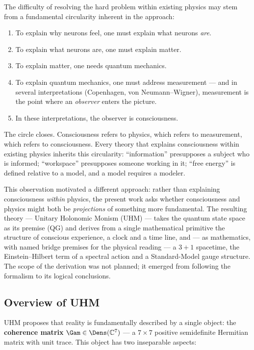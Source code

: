 The difficulty of resolving the hard problem within existing physics may
stem from a fundamental circularity inherent in the approach:

\begin{enumerate}[leftmargin=2em]
  \item To explain why neurons feel, one must explain what neurons \emph{are}.
  \item To explain what neurons are, one must explain matter.
  \item To explain matter, one needs quantum mechanics.
  \item To explain quantum mechanics, one must address measurement --- and in several
        interpretations (Copenhagen, von Neumann--Wigner), measurement is the point where
        an \emph{observer} enters the picture.
  \item In these interpretations, the observer is consciousness.
\end{enumerate}

The circle closes. Consciousness refers to physics, which refers to measurement, which
refers to consciousness. Every theory that explains consciousness within existing physics
inherits this circularity: ``information'' presupposes a subject who is informed;
``workspace'' presupposes someone working in it; ``free energy'' is defined relative to a
model, and a model requires a modeler.

This observation motivated a different approach: rather than explaining
consciousness \emph{within} physics, the present work asks whether
consciousness and physics might both be \emph{projections} of something more
fundamental. The resulting theory --- Unitary Holonomic Monism (UHM) ---
takes the quantum state space as its premise (QG) and derives from a single
mathematical primitive the structure of conscious experience, a clock and a
time line, and --- as mathematics, with named bridge premises for the physical
reading --- a $3+1$ spacetime, the Einstein--Hilbert term of a spectral action
and a Standard-Model gauge structure. The scope of the derivation
was not planned; it emerged from following the formalism to its logical
conclusions.

\subsection{Overview of UHM}

UHM proposes that reality is fundamentally described by a single object: the
\textbf{coherence matrix} $\Gam \in \Dens(\mathbb{C}^7)$ --- a $7 \times 7$ positive
semidefinite Hermitian matrix with unit trace. This object has two inseparable aspects:


